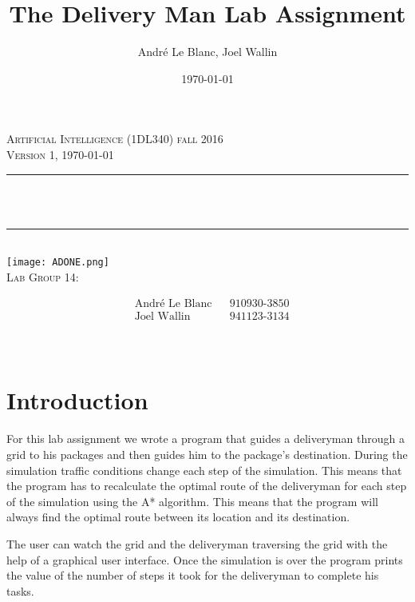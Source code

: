 \documentclass[12pt, a4paper]{article}
\title{The Delivery Man Lab Assignment}	%
\author{André Le Blanc, Joel Wallin}
\date{\today}
\makeatletter
\let\thetitle\@title
\makeatother
\begin{document}
\begin{titlepage}
	\centering
    \vspace*{0.5 cm}
    \textsc{\huge Artificial Intelligence (1DL340) fall 2016}\\[2.0 cm]
	\textsc{\Large Version 1, \today}\\[0.5 cm]
	\rule{\linewidth}{0.2 mm} \\[0.4 cm]
	{ \huge \bfseries \thetitle}\\
   
	\rule{\linewidth}{0.2 mm} \\[1.5 cm]
    
    \texttt{[image: ADONE.png]}\\[0.5 cm]
    
    \textsc{\Large Lab Group 14:}\\[0.5 cm]
	\begin{minipage}{0.4\textwidth}  
    \begin{align*}
	&\text{André Le Blanc}    &&\text{910930-3850}\\
	&\text{Joel Wallin}  &&\text{941123-3134}\\
	\end{align*}
	\end{minipage}\\[2 cm]
\end{titlepage}


\newpage
\tableofcontents
\newpage

\section{Introduction}

For this lab assignment we wrote a program that guides a deliveryman through a grid to his packages and then guides him to the package's destination. During the simulation traffic conditions change each step of the simulation. This means that the program has to recalculate the optimal route of the deliveryman for each step of the simulation using the A* algorithm. This means that the program will always find the optimal route between its location and its destination.

The user can watch the grid and the deliveryman traversing the grid with the help of a graphical user interface. Once the simulation is over the program prints the value of the number of steps it took for the deliveryman to complete his tasks. 
\end{document}
